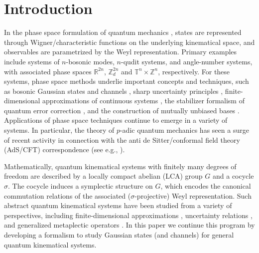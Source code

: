 \documentclass[12pt,reqno]{amsart}
\theoremstyle{definition}
\theoremstyle{definition}
\theoremstyle{definition}
\numberwithin{thm}{section}
\numberwithin{equation}{section}
\newcommand{\Real}{\mathbb R}
\newcommand{\tor}{\mathbb{T}}
\newcommand{\z}{\mathbb{Z}}
\begin{document}
\maketitle

\tableofcontents


\section{Introduction}
In the phase space formulation of quantum mechanics \cite{Groenewold,Moyal,Weyl,Wigner}, states are represented through Wigner/characteristic functions on the underlying kinematical space, and observables are parametrized by the Weyl representation. Primary examples include systems of $n$-bosonic modes, $n$-qudit systems, and angle-number systems, with associated phase spaces $\Real^{2n}$, $\z_d^{2n}$ and $\tor^n\times\z^n$, respectively. For these systems, phase space methods underlie important concepts and techniques, such as bosonic Gaussian states and channels \cite{wetal}, sharp uncertainty principles \cite{Wer-preprint}, finite-dimensional approximations of continuous systems \cite{DVV,Schwinger}, the stabilizer formalism of quantum error correction \cite{CRSS,Got2}, and the construction of mutually unbiased bases \cite{DEBZ,GHW,Partha04}. Applications of phase space techniques continue to emerge in a variety of systems. In particular, the theory of $p$-adic quantum mechanics \cite{VV} has seen a surge of recent activity in connection with the anti de Sitter/conformal field theory (AdS/CFT) correspondence (see e.g., \cite{BHLL,GKPSW,HMSS}).

Mathematically, quantum kinematical systems with finitely many degrees of freedom are described by a locally compact abelian (LCA) group $G$ and a cocycle $\sigma$. The cocycle induces a symplectic structure on $G$, which encodes the canonical commutation relations of the associated ($\sigma$-projective) Weyl representation. Such abstract quantum kinematical systems have been studied from a variety of perspectives, including finite-dimensional approximations \cite{DHV}, uncertainty relations \cite{Wer16}, and generalized metaplectic operators \cite{Weil}. In this paper we continue this program by developing a formalism to study Gaussian states (and channels) for general quantum kinematical systems. 
\end{document}
